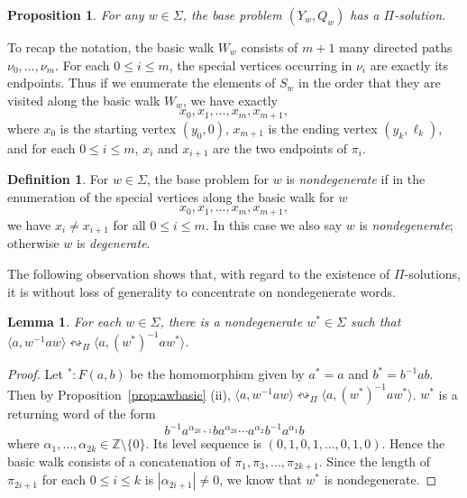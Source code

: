 \documentclass[11pt]{amsart}
\newtheorem{proposition}[theorem]{Proposition}
\newtheorem{lemma}[theorem]{Lemma}
\theoremstyle{definition}
\newtheorem{definition}[theorem]{Definition}
\theoremstyle{definition}
\numberwithin{equation}{section}
\begin{document}
\begin{proposition} For any $w\in \Sigma$, the base problem $(Y_w, Q_w)$ has a $\Pi$-solution.
\end{proposition}

To recap the notation, the basic walk $W_w$ consists of $m+1$ many directed paths $\nu_0,\dots, \nu_{m}$. For each $0\leq i\leq m$, the special vertices occurring in $\nu_i$ are exactly its endpoints. Thus if we enumerate the elements of $S_w$ in the order that they are visited along the basic walk $W_w$, we have exactly
$$ x_0, x_1, \dots, x_m, x_{m+1}, $$
where $x_0$ is the starting vertex $(y_0,0)$, $x_{m+1}$ is the ending vertex $(y_k,\ell_k)$, and for each $0\leq i\leq m$, $x_{i}$ and $x_{i+1}$ are the two endpoints of $\pi_i$. 


\begin{definition} For $w\in \Sigma$, the base problem for $w$ is {\em nondegenerate} if in the enumeration of the special vertices along the basic walk for $w$
$$ x_0, x_1, \dots, x_m, x_{m+1}, $$
we have $x_i\neq x_{i+1}$ for all $0\leq i\leq m$. In this case we also say $w$ is {\em nondegenerate}; otherwise $w$ is {\em degenerate}.
\end{definition}

The following observation shows that, with regard to the existence of $\Pi$-solutions, it is without loss of generality to concentrate on nondegenerate words.

\begin{lemma} For each $w\in \Sigma$, there is a nondegenerate $w^*\in \Sigma$ such that $\langle a, w^{-1}aw\rangle\leftrightsquigarrow_\Pi\big\langle a, (w^*)^{-1}aw^*\big\rangle$.
\end{lemma}

\begin{proof} Let ${}^*\colon F(a,b)$ be the homomorphism given by $a^*=a$ and $b^*=b^{-1}ab$. Then by Proposition~\ref{prop:awbasic} (ii), $\langle a, w^{-1}aw\rangle\leftrightsquigarrow_\Pi\big\langle a, (w^*)^{-1}aw^*\big\rangle$. $w^*$ is a returning word of the form
$$ b^{-1}a^{\alpha_{2k+1}}ba^{\alpha_{2k}}\cdots a^{\alpha_2}b^{-1}a^{\alpha_1}b $$
where $\alpha_1, \dots, \alpha_{2k}\in \mathbb{Z}\setminus\{0\}$. 
Its level sequence is $(0,1,0,1,\dots, 0,1,0)$. Hence the basic walk consists of a concatenation of $\pi_1, \pi_3, \dots, \pi_{2k+1}$. Since the length of $\pi_{2i+1}$ for each $0\leq i\leq k$ is $|\alpha_{2i+1}|\neq 0$, we know that $w^*$ is nondegenerate.
\end{proof}
\end{document}
